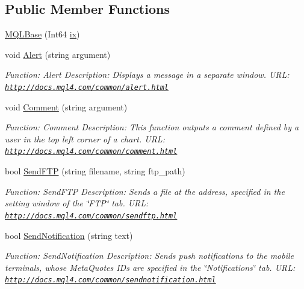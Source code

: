 \subsection*{Public Member Functions}
\begin{DoxyCompactItemize}
\item 
\hyperlink{class_m_q_l4_c_sharp_1_1_base_1_1_m_q_l_base_ab241fa74720effccb53f823714b5fb70}{M\+Q\+L\+Base} (Int64 \hyperlink{class_m_q_l4_c_sharp_1_1_base_1_1_m_q_l_1_1_m_q_l_expert_a98b5a835bb18c023f5160275efa74619}{ix})
\item 
void \hyperlink{class_m_q_l4_c_sharp_1_1_base_1_1_m_q_l_base_aaeeff00f6c946553b13d6bbba46e3eaa}{Alert} (string argument)
\begin{DoxyCompactList}\small\item\em Function\+: Alert Description\+: Displays a message in a separate window. U\+RL\+: \href{http://docs.mql4.com/common/alert.html}{\tt http\+://docs.\+mql4.\+com/common/alert.\+html} \end{DoxyCompactList}\item 
void \hyperlink{class_m_q_l4_c_sharp_1_1_base_1_1_m_q_l_base_a98d25d72cdf45f8031d017b0c9dcd440}{Comment} (string argument)
\begin{DoxyCompactList}\small\item\em Function\+: Comment Description\+: This function outputs a comment defined by a user in the top left corner of a chart. U\+RL\+: \href{http://docs.mql4.com/common/comment.html}{\tt http\+://docs.\+mql4.\+com/common/comment.\+html} \end{DoxyCompactList}\item 
bool \hyperlink{class_m_q_l4_c_sharp_1_1_base_1_1_m_q_l_base_ab6ba3a577e4418cbcb5410c3dbddf2d2}{Send\+F\+TP} (string filename, string ftp\+\_\+path)
\begin{DoxyCompactList}\small\item\em Function\+: Send\+F\+TP Description\+: Sends a file at the address, specified in the setting window of the \char`\"{}\+F\+T\+P\char`\"{} tab. U\+RL\+: \href{http://docs.mql4.com/common/sendftp.html}{\tt http\+://docs.\+mql4.\+com/common/sendftp.\+html} \end{DoxyCompactList}\item 
bool \hyperlink{class_m_q_l4_c_sharp_1_1_base_1_1_m_q_l_base_a2325ab9668121756253da69c94246301}{Send\+Notification} (string text)
\begin{DoxyCompactList}\small\item\em Function\+: Send\+Notification Description\+: Sends push notifications to the mobile terminals, whose Meta\+Quotes I\+Ds are specified in the \char`\"{}\+Notifications\char`\"{} tab. U\+RL\+: \href{http://docs.mql4.com/common/sendnotification.html}{\tt http\+://docs.\+mql4.\+com/common/sendnotification.\+html} \end{DoxyCompactList}\item 

\end{DoxyCompactItemize}

